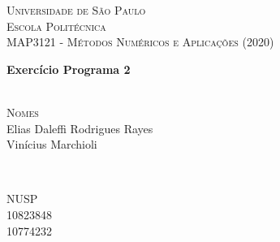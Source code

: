 \documentclass[12pt]{article}
\begin{document}
\begin{titlepage}

\newcommand{\HRule}{\rule{\linewidth}{0.5mm}} 
\center
 

\textsc{\LARGE Universidade de São Paulo}\\[1.5cm]
\textsc{\Large Escola Politécnica}\\[0.5cm] 
\textsc{\large MAP3121 - Métodos Numéricos e Aplicações (2020)}\\
\vspace{70mm}

{\huge \bfseries Exercício Programa 2}\\[0.6cm]
\textsc{\large }\\[2.5cm]
 
\vspace{60mm}
\begin{minipage}{0.4\textwidth}
\begin{flushleft} \large
\footnotesize{\textsc{Nomes}}\\
Elias Daleffi Rodrigues Rayes\\
Vinícius Marchioli\\


\end{flushleft}
\end{minipage}
~
\begin{minipage}{0.4\textwidth}
\begin{flushright} \large
\footnotesize{\textsc{NUSP}}\\
10823848\\
10774232\\

\end{flushright}
\end{minipage}\\[7.5cm]




\vfill 

\end{titlepage}
\end{document}
